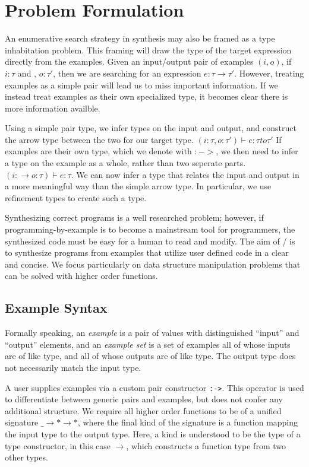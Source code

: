 \section{Problem Formulation}
\label{problem}

An enumerative search strategy in synthesis may also be framed as a type inhabitation problem\cite{DBLP:conf/pldi/GveroKKP13}.
This framing will draw the type of the target expression directly from the examples.
Given an input/output pair of examples $(i,o)$, if $i:\tau$ and , $o:\tau'$, then we are searching for an expression $e:\tau \to \tau'$.
However, treating examples as a simple pair will lead us to miss important information.
If we instead treat examples as their own specialized type, it becomes clear there is more information availble.

Using a simple pair type, we infer types on the input and output, and construct the arrow type between the two for our target type.
$(i:\tau, o:\tau') \vdash e : \tau to \tau'$
If examples are their own type, which we denote with $:->$, we then need to infer a type on the example as a whole, rather than two seperate parts.
$(i :\to o:\tau) \vdash e : \tau$.
We can now infer a type that relates the input and output in a more meaningful way than the simple arrow type.
In particular, we use refinement types to create such a type.

Synthesizing correct programs is a well researched problem; however, if programming-by-example is to become a mainstream tool for programmers, the synthesized code must be easy for a human to read and modify.
The aim of \ourTool/ is to synthesize programs from examples that utilize user defined code in a clear and concise.
We focus particularly on data structure manipulation problems that can be solved with higher order functions.

\subsection{Example Syntax}
Formally speaking, an \textit{example} is a pair of values with distinguished ``input'' and ``output'' elements, and an \textit{example set} is a set of examples all of whose inputs are of like type, and all of whose outputs are of like type. The output type does not necessarily match the input type.

A user supplies examples via a custom pair constructor \texttt{:->}. This operator is used to differentiate between generic pairs and examples, but does not confer any additional structure. We require all higher order functions to be of a unified signature \texttt{$\_ \to * \to *$}, where the final kind of the signature is a function mapping the input type to the output type. Here, a kind is understood to be the type of a type constructor, in this case \texttt{$\to$}, which constructs a function type from two other types.


